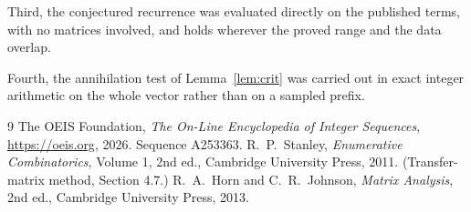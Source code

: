 \documentclass[11pt,a4paper]{article}
\theoremstyle{plain}
\theoremstyle{definition}
\begin{document}
Third, the conjectured recurrence was evaluated directly on the published terms, with no
matrices involved, and holds wherever the proved range and the data overlap.

Fourth, the annihilation test of Lemma~\ref{lem:crit} was carried out in exact integer
arithmetic on the whole vector rather than on a sampled prefix.

\begin{thebibliography}{9}
 The OEIS Foundation, \emph{The On-Line Encyclopedia of Integer
Sequences}, \url{https://oeis.org}, 2026. Sequence A253363.
 R.~P.~Stanley, \emph{Enumerative Combinatorics}, Volume 1, 2nd ed.,
Cambridge University Press, 2011. (Transfer-matrix method, Section 4.7.)
 R.~A.~Horn and C.~R.~Johnson, \emph{Matrix Analysis}, 2nd ed., Cambridge
University Press, 2013.
\end{thebibliography}
\end{document}
